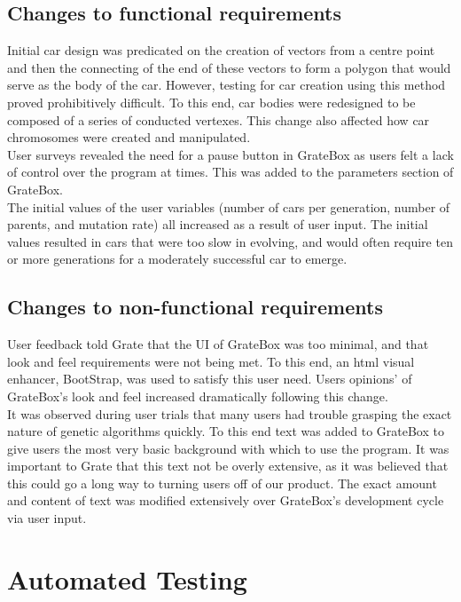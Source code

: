 \documentclass[12pt, titlepage]{article}
\begin{document}
\subsection{Changes to functional requirements}

Initial car design was predicated on the creation of vectors from a centre point 
and then the connecting of the end of these vectors to form a polygon that would 
serve as the body of the car. However, testing for car creation using this 
method proved prohibitively difficult. To this end, car bodies were redesigned 
to be composed of a series of conducted vertexes. This change also affected how 
car chromosomes were created and manipulated.\\

User surveys revealed the need for a pause button in GrateBox as users felt a 
lack of control over the program at times. This was added to the parameters 
section of GrateBox.\\

The initial values of the user variables (number of cars per generation, number 
of parents, and mutation rate) all increased as a result of user input. The 
initial values resulted in cars that were too slow in evolving, and would often 
require ten or more generations for a moderately successful car to emerge. 

\subsection{Changes to non-functional requirements}

User feedback told Grate that the UI of GrateBox was too minimal, and that look 
and feel requirements were not being met. To this end, an html visual enhancer, 
BootStrap, was used to satisfy this user need. Users opinions' of GrateBox's 
look and feel increased dramatically following this change.\\

It was observed during user trials that many users had trouble grasping the 
exact nature of genetic algorithms quickly. To this end text was added to 
GrateBox to give users the most very basic background with which to use the 
program. It was important to Grate that this text not be overly extensive, as it 
was believed that this could go a long way to turning users off of our product. 
The exact amount and content of text was modified extensively over GrateBox's 
development cycle via user input.

\section{Automated Testing}
\end{document}
